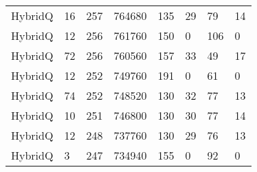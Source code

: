 \begin{table}[h!]
\begin{tabular}{llllllll}
HybridQ                & 16                     & 257            & 764680                  & 135              & 29                   & 79               & 14                  \\
HybridQ                & 12                     & 256            & 761760                  & 150              & 0                    & 106              & 0                   \\
HybridQ                & 72                     & 256            & 760560                  & 157              & 33                   & 49               & 17                  \\
HybridQ                & 12                     & 252            & 749760                  & 191              & 0                    & 61               & 0                   \\
HybridQ                & 74                     & 252            & 748520                  & 130              & 32                   & 77               & 13                  \\
HybridQ                & 10                     & 251            & 746800                  & 130              & 30                   & 77               & 14                  \\
HybridQ                & 12                     & 248            & 737760                  & 130              & 29                   & 76               & 13                  \\
HybridQ                & 3                      & 247            & 734940                  & 155              & 0                    & 92               & 0                  
\end{tabular}
\end{table}